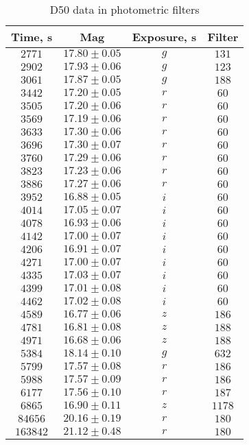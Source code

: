 \documentclass{naturesubmissionstyle}
\begin{document}

\begin{table}
\centering
\begin{tabular}{cccc}

Time, s & Mag & Exposure, s & Filter \\
\hline
$2771$ & $17.80\pm0.05$ & $g$ & $131$ \\
$2902$ & $17.93\pm0.06$ & $g$ & $123$ \\
$3061$ & $17.87\pm0.05$ & $g$ & $188$ \\
$3442$ & $17.20\pm0.05$ & $r$ & $60$ \\
$3505$ & $17.20\pm0.06$ & $r$ & $60$ \\
$3569$ & $17.19\pm0.06$ & $r$ & $60$ \\
$3633$ & $17.30\pm0.06$ & $r$ & $60$ \\
$3696$ & $17.30\pm0.07$ & $r$ & $60$ \\
$3760$ & $17.29\pm0.06$ & $r$ & $60$ \\
$3823$ & $17.23\pm0.06$ & $r$ & $60$ \\
$3886$ & $17.27\pm0.06$ & $r$ & $60$ \\
$3952$ & $16.88\pm0.05$ & $i$ & $60$ \\
$4014$ & $17.05\pm0.07$ & $i$ & $60$ \\
$4078$ & $16.93\pm0.06$ & $i$ & $60$ \\
$4142$ & $17.00\pm0.07$ & $i$ & $60$ \\
$4206$ & $16.91\pm0.07$ & $i$ & $60$ \\
$4271$ & $17.00\pm0.07$ & $i$ & $60$ \\
$4335$ & $17.03\pm0.07$ & $i$ & $60$ \\
$4399$ & $17.01\pm0.08$ & $i$ & $60$ \\
$4462$ & $17.02\pm0.08$ & $i$ & $60$ \\
$4589$ & $16.77\pm0.06$ & $z$ & $186$ \\
$4781$ & $16.81\pm0.08$ & $z$ & $188$ \\
$4971$ & $16.68\pm0.06$ & $z$ & $188$ \\
$5384$ & $18.14\pm0.10$ & $g$ & $632$ \\
$5799$ & $17.57\pm0.08$ & $r$ & $186$ \\
$5988$ & $17.57\pm0.09$ & $r$ & $186$ \\
$6177$ & $17.56\pm0.10$ & $r$ & $187$ \\
$6865$ & $16.90\pm0.11$ & $z$ & $1178$ \\
$84656$ & $20.16\pm0.19$ & $r$ & $180$ \\
$163842$ & $21.12\pm0.48$ & $r$ & $180$ \\

\hline	

\end{tabular}
\caption{D50 data in photometric filters}
\label{table:d50_filters}
\end{table}
\end{document}
